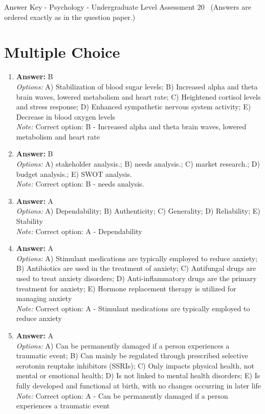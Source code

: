 \documentclass[12pt]{article}
\begin{document}
\begin{center}
Answer Key - Psychology - Undergraduate Level Assessment 20 \
\small (Answers are ordered exactly as in the question paper.)
\end{center}

\section*{Multiple Choice}
\begin{enumerate}[label=\arabic*.]
\item \textbf{Answer:} B
\\ \textit{Options:} A) Stabilization of blood sugar levels; B) Increased alpha and theta brain waves, lowered metabolism and heart rate; C) Heightened cortisol levels and stress response; D) Enhanced sympathetic nervous system activity; E) Decrease in blood oxygen levels
\\ \textit{Note:} Correct option: B - Increased alpha and theta brain waves, lowered metabolism and heart rate
\item \textbf{Answer:} B
\\ \textit{Options:} A) stakeholder analysis.; B) needs analysis.; C) market research.; D) budget analysis.; E) SWOT analysis.
\\ \textit{Note:} Correct option: B - needs analysis.
\item \textbf{Answer:} A
\\ \textit{Options:} A) Dependability; B) Authenticity; C) Generality; D) Reliability; E) Stability
\\ \textit{Note:} Correct option: A - Dependability
\item \textbf{Answer:} A
\\ \textit{Options:} A) Stimulant medications are typically employed to reduce anxiety; B) Antibiotics are used in the treatment of anxiety; C) Antifungal drugs are used to treat anxiety disorders; D) Anti-inflammatory drugs are the primary treatment for anxiety; E) Hormone replacement therapy is utilized for managing anxiety
\\ \textit{Note:} Correct option: A - Stimulant medications are typically employed to reduce anxiety
\item \textbf{Answer:} A
\\ \textit{Options:} A) Can be permanently damaged if a person experiences a traumatic event; B) Can mainly be regulated through prescribed selective serotonin reuptake inhibitors (SSRIs); C) Only impacts physical health, not mental or emotional health; D) Is not linked to mental health disorders; E) Is fully developed and functional at birth, with no changes occurring in later life
\\ \textit{Note:} Correct option: A - Can be permanently damaged if a person experiences a traumatic event
\end{enumerate}
\end{document}
